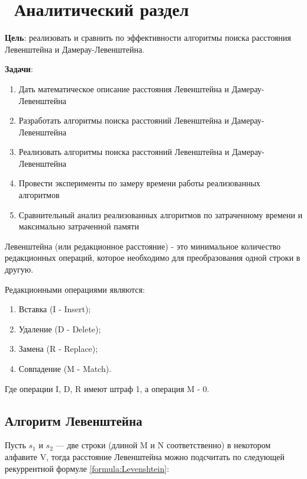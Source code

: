 \chapter{ Аналитический раздел}
\label{cha:analytical}
    {\bf Цель}: реализовать и сравнить по эффективности алгоритмы поиска
    расстояния Левенштейна и Дамерау-Левенштейна.

    {\bf Задачи}:
    \begin{enumerate}[1)]
        \item Дать математическое описание расстояния Левенштейна и Дамерау-Левенштейна
        \item Разработать алгоритмы поиска расстояний Левенштейна и Дамерау-Левенштейна
        \item Реализовать алгоритмы поиска расстояний Левенштейна и Дамерау-Левенштейна
        \item Провести эксперименты по замеру времени работы реализованных алгоритмов
        \item Сравнительный анализ реализованных алгоритмов по затраченному времени и максимально затраченной памяти
    \end{enumerate}

    { Левенштейна} (или редакционное расстояние) - это минимальное
    количество редакционных операций, которое необходимо для преобразования одной строки в другую.

    Редакционными операциями являются: \begin{enumerate}[1)]
        \item Вставка (I - Insert);
        \item Удаление (D - Delete);
        \item Замена (R - Replace);
        \item Совпадение (M - Match).
    \end{enumerate}
    Где операции I, D, R имеют штраф 1, а операция M - 0.

    \section{Алгоритм Левенштейна}
    Пусть $s_{1}$ и $s_{2}$ — две строки (длиной M и N соответственно) в некотором алфавите V,
    тогда расстояние Левенштейна можно подсчитать по следующей рекуррентной формуле \ref{formula:Levenshtein}:

